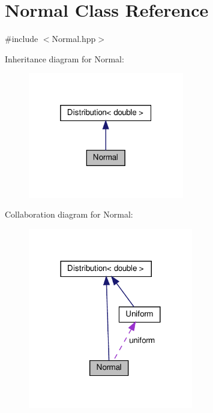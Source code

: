 \hypertarget{class_normal}{}\section{Normal Class Reference}
\label{class_normal}


{\ttfamily \#include $<$Normal.\+hpp$>$}



Inheritance diagram for Normal\+:\nopagebreak
\begin{figure}[H]
\begin{center}
\leavevmode
\includegraphics[width=193pt]{class_normal__inherit__graph}
\end{center}
\end{figure}


Collaboration diagram for Normal\+:\nopagebreak
\begin{figure}[H]
\begin{center}
\leavevmode
\includegraphics[width=204pt]{class_normal__coll__graph}
\end{center}
\end{figure}
